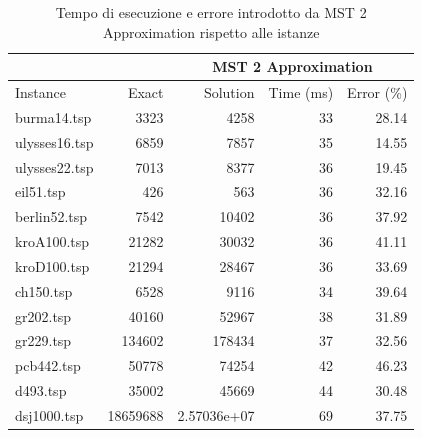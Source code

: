 \begin{table}[h]
    \centering

    \begin{tabular}{lrrrr}
    \toprule
    \multicolumn{2}{c}{ } & \multicolumn{3}{c}{MST 2 Approximation} \\
    \hline
    Instance & Exact & Solution &   Time (ms) &   Error (\%) \\
    \hline
    burma14.tsp   &     3323 &   4258           &          33 &       28.14 \\
    ulysses16.tsp &     6859 &   7857           &          35 &       14.55 \\
    ulysses22.tsp &     7013 &   8377           &          36 &       19.45 \\
    eil51.tsp     &      426 &    563           &          36 &       32.16 \\
    berlin52.tsp  &     7542 &  10402           &          36 &       37.92 \\
    kroA100.tsp   &    21282 &  30032           &          36 &       41.11 \\
    kroD100.tsp   &    21294 &  28467           &          36 &       33.69 \\
    ch150.tsp     &     6528 &   9116           &          34 &       39.64 \\
    gr202.tsp     &    40160 &  52967           &          38 &       31.89 \\
    gr229.tsp     &   134602 & 178434           &          37 &       32.56 \\
    pcb442.tsp    &    50778 &  74254           &          42 &       46.23 \\
    d493.tsp      &    35002 &  45669           &          44 &       30.48 \\
    dsj1000.tsp   & 18659688 &      2.57036e+07 &          69 &       37.75 \\
    \bottomrule
    \end{tabular}

    \caption{Tempo di esecuzione e errore introdotto da MST 2 Approximation rispetto alle istanze}
    \label{table:mst2approx-runtime-accuracy}
\end{table}

